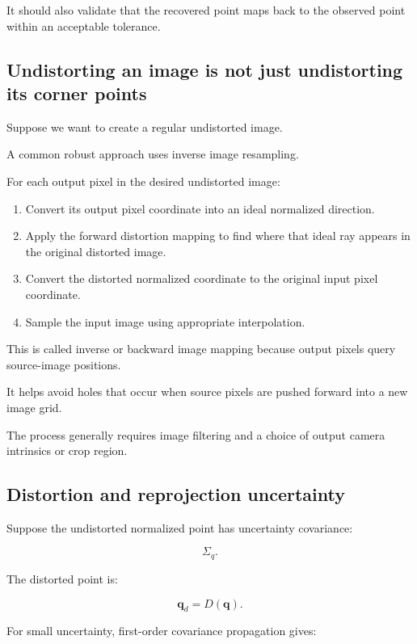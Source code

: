 It should also validate that the recovered point maps back to the observed point within an acceptable tolerance.

\subsection{Undistorting an image is not just undistorting its corner points}\label{02-foundations-ii-ch035-undistorting-an-image-is-not-just-undistorting-its-corner-points}

Suppose we want to create a regular undistorted image.

A common robust approach uses inverse image resampling.

For each output pixel in the desired undistorted image:

\begin{enumerate}
\def\labelenumi{\arabic{enumi}.}
\tightlist
\item
  Convert its output pixel coordinate into an ideal normalized direction.
\item
  Apply the forward distortion mapping to find where that ideal ray appears in the original distorted image.
\item
  Convert the distorted normalized coordinate to the original input pixel coordinate.
\item
  Sample the input image using appropriate interpolation.
\end{enumerate}

This is called inverse or backward image mapping because output pixels query source-image positions.

It helps avoid holes that occur when source pixels are pushed forward into a new image grid.

The process generally requires image filtering and a choice of output camera intrinsics or crop region.

\subsection{Distortion and reprojection uncertainty}\label{02-foundations-ii-ch035-distortion-and-reprojection-uncertainty}

Suppose the undistorted normalized point has uncertainty covariance:

\[
 \Sigma_q.
\]

The distorted point is:

\[
 \mathbf q_d=D(\mathbf q).
\]

For small uncertainty, first-order covariance propagation gives:

